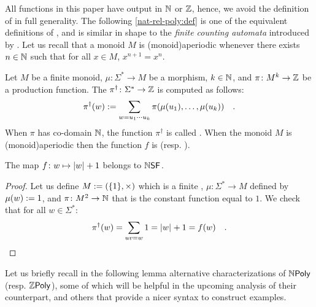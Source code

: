 \AP All functions in this paper have output in $\mathbb{N}$ or $\mathbb{Z}$, hence, we
avoid the definition of  in full generality. The
following \cref{nat-rel-poly:def} is one of the equivalent definitions of
\cite{LOPEZ23b}, and is similar in shape to the \emph{finite counting automata}
introduced by \textcite{schutzenberger1962}. Let us recall that a monoid $M$ is
\intro(monoid){aperiodic} whenever there exists $n \in \mathbb{N}$ such that for all
$x \in M$, $x^{n+1} = x^n$.

\begin{definition}
    \label{nat-rel-poly:def}
    Let $M$ be a finite monoid, $\mu \colon \Sigma^* \to M$
    be a morphism, $k \in \mathbb{N}$, and 
    $\pi \colon M^k \to \mathbb{Z}$ be a production function.
    The 
    $\pi^\dagger \colon \Sigma^* \to \mathbb{Z}$
    is computed as follows:
    \begin{equation*}
        \pi^\dagger (w) \mathrel{:=}
        \sum_{w = u_1 \cdots u_k} \pi(\mu(u_1), \dots, \mu(u_k))
        \quad .
    \end{equation*}
    When $\pi$ has co-domain $\mathbb{N}$, the function $\pi^\dagger$
    is called .
    When the monoid $M$ is \kl(monoid){aperiodic}
    then
    the function $f$ is 
    (resp. ).
\end{definition}


\begin{example}
    The map $f \colon w \mapsto \card{w} + 1$
    belongs to $\NSF$.
\end{example}
\begin{proof}
    Let us define $M \mathrel{:=} (\mathopen{\{} 1 \mathclose{\}}, \times)$ which is 
    a finite , $\mu \colon \Sigma^* \to M$
    defined by $\mu(w) \mathrel{:=} 1$, and
    $\pi \colon M^2 \to \mathbb{N}$
    that is the constant function equal to $1$.
    We check that for all $w \in \Sigma^*$:
    \begin{equation*}
        \pi^\dagger(w)
        =
        \sum_{uv = w} 1
        =
        \card{w} + 1
        = f(w)
        \quad . 
        \qedhere
    \end{equation*}
\end{proof}


\AP Let us briefly recall in the following lemma alternative characterizations
of $\NPoly$ (resp. $\ZPoly$), some of which will be helpful in the upcoming
analysis of their  counterpart, and others that provide
a nicer syntax to construct examples.

